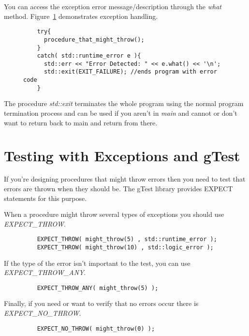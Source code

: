 \documentclass[nobib]{tufte-handout}
\begin{document}
You can access the exception error message/description through the \textit{what} method. Figure~\ref{trycatchdemo} demonstrates exception handling.

\begin{figure}[htbp!]
  \begin{lstlisting}
    try{
      procedure_that_might_throw();
    }
    catch( std::runtime_error e ){
      std::err << "Error Detected: " << e.what() << '\n';
      std::exit(EXIT_FAILURE); //ends program with error code
    }
  \end{lstlisting}
\label{trycatchdemo}
\end{figure}

The procedure \textit{std::exit} terminates the whole program using the normal program termination process and can be used if you aren't in \textit{main} and cannot or don't want to return back to main and return from there.

\section{Testing with Exceptions and gTest}

If you're designing procedures that might throw errors then you need to test that errors are thrown when they should be. The gTest library provides EXPECT statements for this purpose.

When a procedure might throw several types of exceptions you should use \textit{EXPECT\_THROW}.
\begin{figure}[htbp!]
  \begin{lstlisting}
    EXPECT_THROW( might_throw(5) , std::runtime_error );
    EXPECT_THROW( might_throw(10) , std::logic_error );
  \end{lstlisting}
\end{figure}

If the type of the error isn't important to the test, you can use \textit{EXPECT\_THROW\_ANY}.
\begin{figure}[htbp!]
  \begin{lstlisting}
    EXPECT_THROW_ANY( might_throw(5) );
  \end{lstlisting}
\end{figure}

Finally, if you need or want to verify that no errors occur there is \textit{EXPECT\_NO\_THROW}.
\begin{figure}[htbp!]
  \begin{lstlisting}
    EXPECT_NO_THROW( might_throw(0) );
  \end{lstlisting}
\end{figure}
\end{document}
